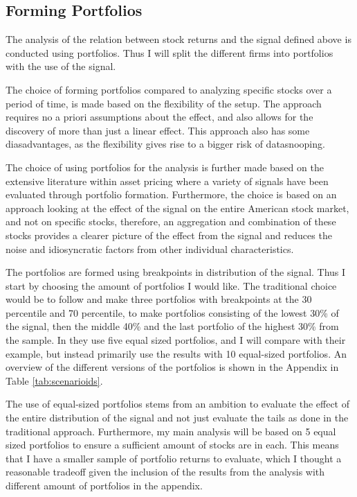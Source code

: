 \subsection{Forming Portfolios}

The analysis of the relation between stock returns and the signal defined above is conducted using portfolios. Thus I will split the different firms into portfolios with the use of the signal. 

The choice of forming portfolios compared to analyzing specific stocks over a period of time, is made based on the flexibility  of the setup. The approach requires no a priori assumptions about the effect, and also allows for the discovery of more than just a linear effect. This approach also has some diasadvantages, as the flexibility gives rise to a bigger risk of datasnooping. 

The choice of using portfolios for the analysis is further made based on the extensive literature within asset pricing where a variety of signals have been evaluated through portfolio formation. Furthermore, the choice is based on an approach looking at the effect of the signal on the entire American stock market, and not on specific stocks, therefore, an aggregation and combination of these stocks provides a clearer picture of the effect from the signal and reduces the noise and idiosyncratic factors from other individual characteristics. 

The portfolios are formed using breakpoints in distribution of the signal. Thus I start by choosing the amount of portfolios I would like. The traditional choice would be to follow \cite{fama1992cross} and make three portfolios with breakpoints at the 30 percentile and 70 percentile, to make portfolios consisting of the lowest 30\% of the signal, then the middle 40\%  and the last portfolio of the highest 30\% from the sample. In \cite{cremers2010deviations} they use five equal sized portfolios, and I will compare with their example, but instead primarily use the results with 10 equal-sized portfolios. An overview of the different versions of the portfolios is shown in the Appendix in Table \ref{tab:scenarioids}.

The use of equal-sized portfolios stems from an ambition to evaluate the effect of the entire distribution of the signal and not just evaluate the tails as done in the traditional approach. Furthermore, my main analysis will be based on 5 equal sized portfolios to ensure a sufficient amount of stocks are in each. This means that I have a smaller sample of portfolio returns to evaluate, which I thought a reasonable tradeoff given the inclusion of the results from the analysis with different amount of portfolios in the appendix.

